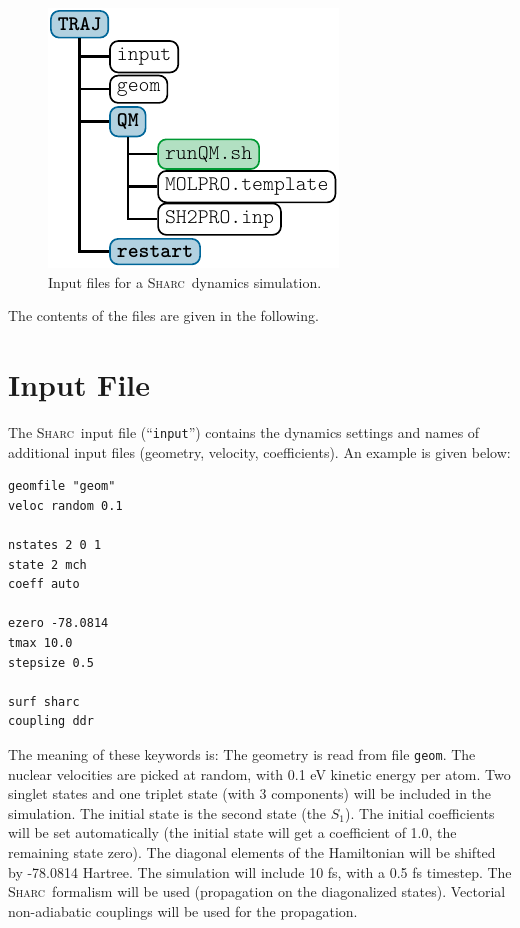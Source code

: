 \documentclass[a4paper,11pt,DIV=15,openany]{scrbook}
\newcommand{\sharc}{\textsc{Sharc}}
\newcommand{\ttt}[1]{\texttt{#1}}
\begin{document}
\begin{figure}
  \centering
  \includegraphics[]{img/dir_traj/dir_traj.pdf}
  \caption{Input files for a \sharc\ dynamics simulation.}
  \label{fig:traj_dir}
\end{figure}

The contents of the files are given in the following.

\section{Input File}

The \sharc\ input file (``\ttt{input}'') contains the dynamics settings and names of additional input files (geometry, velocity, coefficients). An example is given below:
\begin{shaded}\vspace{-8mm}
\begin{verbatim}
geomfile "geom"
veloc random 0.1

nstates 2 0 1 
state 2 mch
coeff auto

ezero -78.0814
tmax 10.0
stepsize 0.5

surf sharc
coupling ddr
\end{verbatim}\vspace{-5mm}
\end{shaded}

The meaning of these keywords is: The geometry is read from file \ttt{geom}. The nuclear velocities are picked at random, with 0.1 eV kinetic energy per atom. Two singlet states and one triplet state (with 3 components) will be included in the simulation. The initial state is the second state (the $S_1$). The initial coefficients will be set automatically (the initial state will get a coefficient of 1.0, the remaining state zero). The diagonal elements of the Hamiltonian will be shifted by -78.0814 Hartree. The simulation will include 10 fs, with a 0.5 fs timestep. The \sharc\ formalism will be used (propagation on the diagonalized states). Vectorial non-adiabatic couplings will be used for the propagation. 
\end{document}
